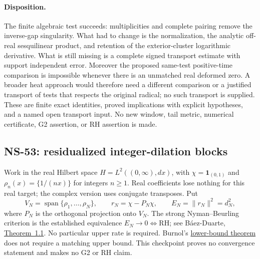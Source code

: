 \paragraph{Disposition.}
The finite algebraic test succeeds: multiplicities and complete
pairing remove the inverse-gap singularity. What had to change is
the normalization, the analytic off-real sesquilinear product, and
retention of the exterior-cluster logarithmic derivative. What is
still missing is a complete signed transport estimate with support
independent error. Moreover the proposed same-test positive-time
comparison is impossible whenever there is an unmatched real
deformed zero. A broader heat approach would therefore need a
different comparison or a justified transport of tests that respects
the original radical; no such transport is supplied. These are
finite exact identities, proved implications with explicit hypotheses,
and a named open transport input. No new window, tail metric,
numerical certificate, G2 assertion, or RH assertion is made.


\subsection{NS-53: residualized integer-dilation blocks}
\label{sec:ns53-nb-blocks}

Work in the real Hilbert space $H=L^2((0,\infty),dx)$, with
$\chi=\mathbf 1_{(0,1)}$ and $\rho_n(x)=\{1/(nx)\}$ for integers $n\geq1$.
Real coefficients lose nothing for this real target; the complex version
uses conjugate transposes. Put
\[
 V_N=\operatorname{span}\{\rho_1,\ldots,\rho_N\},\qquad
 r_N=\chi-P_N\chi,\qquad E_N=\|r_N\|^2=d_N^2,
\]
where $P_N$ is the orthogonal projection onto $V_N$.
The strong Nyman--Beurling criterion is the established equivalence
$E_N\to0\Longleftrightarrow\mathrm{RH}$; see B\'aez-Duarte,
\href{https://arxiv.org/abs/math/0202141}{Theorem~1.1}.
No particular upper rate is required. Burnol's
\href{https://doi.org/10.1006/aima.2001.2066}{lower-bound theorem}
does not require a matching upper bound. This checkpoint proves no
convergence statement and makes no G2 or RH claim.

